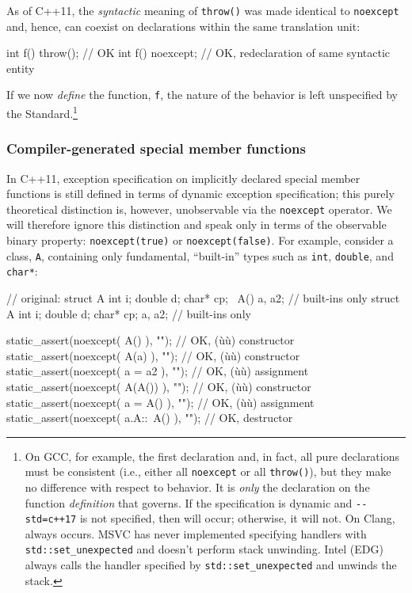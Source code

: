 \noindent As of C++11, the \emph{syntactic} meaning of \lstinline!throw()! was made
identical to \lstinline!noexcept! and, hence, can coexist on declarations
within the same translation unit:

\begin{emcppslisting}
int f() throw();    // OK
int f() noexcept;   // OK, redeclaration of same syntactic entity
\end{emcppslisting}
    

\noindent If we now \emph{define} the function, \lstinline!f!, the nature of the
 behavior is left unspecified by the
Standard.{\cprotect\footnote{On GCC, for example, the first declaration
and, in fact, all pure declarations must be consistent (i.e., either
all \lstinline!noexcept! or all \lstinline!throw()!), but they make no
difference with respect to behavior. It is \emph{only} the declaration
on the function \emph{definition} that governs. If the specification
is dynamic and \lstinline!--std=c++17! is not specified, then
 will occur; otherwise, it will not. On Clang,
 always occurs. MSVC has never implemented
specifying handlers with \lstinline!std::set_unexpected! and doesn't
perform stack unwinding. Intel (EDG) always calls the handler
  specified by \lstinline!std::set_unexpected! and unwinds the stack.}}

\subsubsection[Compiler-generated special member functions]{Compiler-generated special member functions}\label{compiler-generated-special-member-functions}

In C++11, exception specification on implicitly declared special member
functions is still defined in terms of dynamic exception specification;
this purely theoretical distinction is, however, unobservable via the
\lstinline!noexcept! operator. We will therefore ignore this distinction
and speak only in terms of the observable binary property:
\lstinline!noexcept(true)! or \lstinline!noexcept(false)!. For example,
consider a class, \lstinline!A!, containing only fundamental, ``built-in''
types such as \lstinline!int!, \lstinline!double!, and \lstinline!char*!:

\begin{emcppslisting}[emcppsbatch=e6]
// original: struct A { int i; double d; char* cp; ~A() } a, a2;  // built-ins only
struct A { int i; double d; char* cp; } a, a2;  // built-ins only

static_assert(noexcept( A()       ), "");  // OK, (ù{}ù) constructor
static_assert(noexcept( A(a)      ), "");  // OK, (ù{}ù) constructor
static_assert(noexcept( a = a2    ), "");  // OK, (ù{}ù) assignment
static_assert(noexcept( A(A())    ), "");  // OK, (ù{}ù) constructor
static_assert(noexcept( a = A()   ), "");  // OK, (ù{}ù) assignment
static_assert(noexcept( a.A::~A() ), "");  // OK, destructor
\end{emcppslisting}
    

